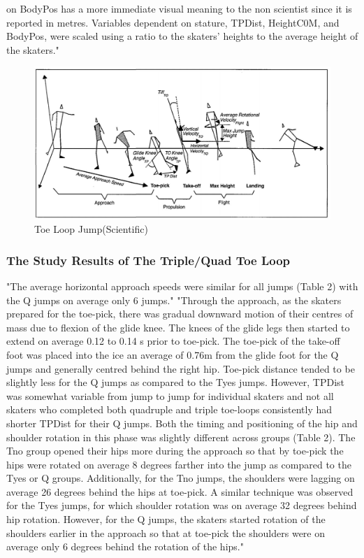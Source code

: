 \documentclass[12pt,journal,compsoc]{IEEEtran}
\begin{document}
on BodyPos has a more immediate visual meaning to the non scientist since it
is reported in metres. Variables dependent on stature, TPDist, HeightC0M, and
BodyPos, were scaled using a ratio to the skaters' heights to the average height
of the skaters."\cite{Toe}
\begin{figure}[h]
	\centering
	\includegraphics[width=\linewidth]{ToeLoop.JPG}
	\caption{Toe Loop Jump(Scientific)}
	\label{Fig:AxelJump}
\end{figure}

\subsubsection{The Study Results of The Triple/Quad Toe Loop}
"The average horizontal approach speeds were similar for all jumps (Table 2)
with the Q jumps on average only 6%
 jumps." \cite{Toe}
"Through the approach, as the skaters prepared for the toe-pick, there was gradual downward motion of their centres of mass due to flexion of the glide knee.
The knees of the glide legs then started to extend on average 0.12 to 0.14 s prior
to toe-pick. The toe-pick of the take-off foot was placed into the ice an average
of 0.76m from the glide foot for the Q jumps and generally centred behind the
right hip. Toe-pick distance tended to be slightly less for the Q jumps as compared to the Tyes
 jumps. However, TPDist was somewhat variable from jump
to jump for individual skaters and not all skaters who completed both quadruple and triple toe-loops consistently had shorter TPDist for their Q jumps.
Both the timing and positioning of the hip and shoulder rotation in this
phase was slightly different across groups (Table 2). The Tno group opened
their hips more during the approach so that by toe-pick the hips were rotated
on average 8 degrees farther into the jump as compared to the Tyes
 or Q groups.
Additionally, for the Tno jumps, the shoulders were lagging on average 26
degrees behind the hips at toe-pick. A similar technique was observed for the
Tyes
 jumps, for which shoulder rotation was on average 32 degrees behind hip
rotation. However, for the Q jumps, the skaters started rotation of the shoulders
earlier in the approach so that at toe-pick the shoulders were on average only 6
degrees behind the rotation of the hips." \cite{Toe}
\end{document}
